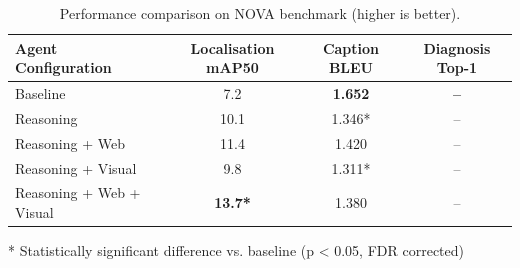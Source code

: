 \begin{table}[t]
  \caption{Performance comparison on NOVA benchmark (higher is better).}
  \label{tab:performance}
  \centering
  \begin{tabular}{lccc}
    \hline
    \textbf{Agent Configuration} & \textbf{Localisation mAP50} & \textbf{Caption BLEU} & \textbf{Diagnosis Top-1}\\
    \hline
    Baseline                  & 7.2 & \textbf{1.652} & \textbf{--}\\
    Reasoning                 & 10.1 & 1.346* & --\\
    Reasoning + Web           & 11.4 & 1.420 & --\\
    Reasoning + Visual        & 9.8 & 1.311* & --\\
    Reasoning + Web + Visual  & \textbf{13.7*} & 1.380 & --\\
    \hline
  \end{tabular}
  \begin{flushleft}
  \footnotesize{* Statistically significant difference vs. baseline (p < 0.05, FDR corrected)}
  \end{flushleft}
\end{table}